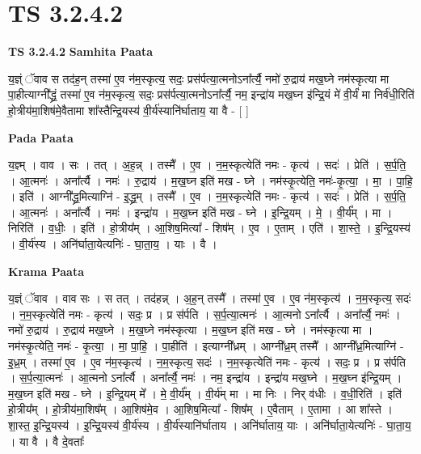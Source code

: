 \documentclass[17pt]{extarticle}
\begin{document}

\section{ TS 3.2.4.2 }

\textbf{TS 3.2.4.2 } \newline
\textbf{Samhita Paata} \newline

य॒ज्ञ्ं ॅवाव स तद॑ह॒न् तस्मा॑ ए॒व न॑म॒स्कृत्य॒ सदः॒ प्रस॑र्पत्या॒त्मनोऽना᳚र्त्यै॒ नमो॑ रु॒द्राय॑ मख॒घ्ने नम॑स्कृत्या मा पा॒हीत्याग्नी᳚द्ध्रं॒ तस्मा॑ ए॒व न॑म॒स्कृत्य॒ सदः॒ प्रस॑र्पत्या॒त्मनोऽना᳚र्त्यै॒ नम॒ इन्द्रा॑य मख॒घ्न इ॑न्द्रि॒यं मे॑ वी॒र्यं॑ मा निर्व॑धी॒रिति॑ हो॒त्रीय॑मा॒शिष॑मे॒वैतामा शा᳚स्तैन्द्रि॒यस्य॑ वी॒र्य॑स्यानि॑र्घाताय॒ या वै - [  ] \newline

\textbf{Pada Paata} \newline

य॒ज्ञ्म् । वाव । सः । तत् । अ॒ह॒न्न् । तस्मै᳚ । ए॒व । न॒म॒स्कृत्येति॑ नमः - कृत्य॑ । सदः॑ । प्रेति॑ । स॒र्प॒ति॒ । आ॒त्मनः॑ । अना᳚र्त्यै । नमः॑ । रु॒द्राय॑ । म॒ख॒घ्न इति॑ मख - घ्ने । नम॑स्कृ॒त्येति॒ नमः॑-कृ॒त्या॒ । मा॒ । पा॒हि॒ । इति॑ । आग्नी᳚द्ध्र॒मित्याग्नि॑ - इ॒द्ध्र॒म् । तस्मै᳚ । ए॒व । न॒म॒स्कृत्येति॑ नमः - कृत्य॑ । सदः॑ । प्रेति॑ । स॒र्प॒ति॒ । आ॒त्मनः॑ । अना᳚र्त्यै । नमः॑ । इन्द्रा॑य । म॒ख॒घ्न इति॑ मख - घ्ने । इ॒न्द्रि॒यम् । मे॒ । वी॒र्य᳚म् । मा । निरिति॑ । व॒धीः॒ । इति॑ । हो॒त्रीय᳚म् । आ॒शिष॒मित्या᳚ - शिष᳚म् । ए॒व । ए॒ताम् । एति॑ । शा॒स्ते॒ । इ॒न्द्रि॒यस्य॑ । वी॒र्य॑स्य । अनि॑र्घाता॒येत्यनिः॑ - घा॒ता॒य॒ । याः । वै ।  \newline


\textbf{Krama Paata} \newline

य॒ज्ञ्ं ॅवाव । वाव सः । स तत् । तद॑हन्न् । अ॒ह॒न् तस्मै᳚ । तस्मा॑ ए॒व । ए॒व न॑म॒स्कृत्य॑ । न॒म॒स्कृत्य॒ सदः॑ । न॒म॒स्कृत्येति॑ नमः - कृत्य॑ । सदः॒ प्र । प्र स॑र्पति । स॒र्प॒त्या॒त्मनः॑ । आ॒त्मनो ऽना᳚र्त्यै । अना᳚र्त्यै॒ नमः॑ । नमो॑ रु॒द्राय॑ । रु॒द्राय॑ मख॒घ्ने । म॒ख॒घ्ने नम॑स्कृत्या । म॒ख॒घ्न इति॑ मख - घ्ने । नम॑स्कृत्या मा । नम॑स्कृ॒त्येति॒ नमः॑ - कृ॒त्या॒ । मा॒ पा॒हि॒ । पा॒हीति॑ । इत्याग्नी᳚ध्रम् । आग्नी᳚ध्र॒म् तस्मै᳚ । आग्नी᳚ध्र॒मित्याग्नि॑ - इ॒ध्र॒म् । तस्मा॑ ए॒व । ए॒व न॑म॒स्कृत्य॑ । न॒म॒स्कृत्य॒ सदः॑ । न॒म॒स्कृत्येति॑ नमः - कृत्य॑ । सदः॒ प्र । प्र स॑र्पति । स॒र्प॒त्या॒त्मनः॑ । आ॒त्मनो ऽना᳚र्त्यै । अना᳚र्त्यै॒ नमः॑ । नम॒ इन्द्रा॑य । इन्द्रा॑य मख॒घ्ने । म॒ख॒घ्न इ॑न्द्रि॒यम् । म॒ख॒घ्न इति॑ मख - घ्ने । इ॒न्द्रि॒यम् मे᳚ । मे॒ वी॒र्य᳚म् । वी॒र्य॑म् मा । मा निः । निर् व॑धीः । व॒धी॒रिति॑ । इति॑ हो॒त्रीय᳚म् । हो॒त्रीय॑मा॒शिष᳚म् । आ॒शिष॑मे॒व । आ॒शिष॒मित्या᳚ - शिष᳚म् । ए॒वैताम् । ए॒तामा । आ शा᳚स्ते । शा॒स्त॒ इ॒न्द्रि॒यस्य॑ । इ॒न्द्रि॒यस्य॑ वी॒र्य॑स्य । वी॒र्य॑स्यानि॑र्घाताय । अनि॑र्घाताय॒ याः । अनि॑र्घाता॒येत्यनिः॑ - घा॒ता॒य॒ । या वै । वै दे॒वताः᳚ \newline
\end{document}
